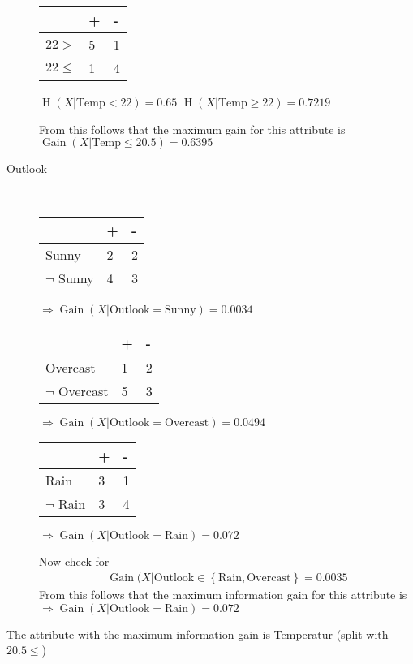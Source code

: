 \documentclass[10pt,a4paper,boxed]{hmcpset}
\DeclareMathOperator{\gain}{Gain}
\DeclareMathOperator{\entropy}{H}
\begin{document}
\begin{solution}
\begin{description}
			\begin{tabular}[H]{l|ll}
				& + & - \\ \hline
				$22 > $		& 5 & 1 \\
				$22 \leq$ & 1 & 4 \\
			\end{tabular}
			$\entropy(X|\mathrm{Temp}<22) = 0.65$
			$\entropy(X|\mathrm{Temp}\geq 22) = 0.7219$

			From this follows that the maximum gain for this attribute is 
			$\gain(X|\mathrm{Temp} \leq 20.5) = 0.6395$

		\item[Outlook]  \hfill \\
			\begin{tabular}[H]{l|ll}
				& + & - \\ \hline
				Sunny				 & 2 & 2 \\
				$\neg$ Sunny & 4 & 3 \\
			\end{tabular}
			$\Rightarrow \gain(X|\mathrm{Outlook}=\mathrm{Sunny}) = 0.0034$

			\begin{tabular}[H]{l|ll}
				& + & - \\ \hline
				Overcast				 & 1 & 2 \\
				$\neg$ Overcast & 5 & 3 \\
			\end{tabular}
			$\Rightarrow \gain(X|\mathrm{Outlook}=\mathrm{Overcast}) = 0.0494$

			\begin{tabular}[H]{l|ll}
				& + & - \\ \hline
				Rain				 & 3 & 1 \\
				$\neg$ Rain & 3 & 4 \\
			\end{tabular}
			$\Rightarrow \gain(X|\mathrm{Outlook}=\mathrm{Rain}) = 0.072$

			Now check for 
			\begin{align}
				\gain(X|\mathrm{Outlook}\in \left\{ \mathrm{Rain},\mathrm{Overcast} \right\} = 0.0035
			\end{align}
			From this follows that the maximum information gain for this attribute is 
			$\Rightarrow \gain(X|\mathrm{Outlook}=\mathrm{Rain}) = 0.072$
			\end{description}
			The attribute with the maximum information gain is Temperatur (split with $20.5\leq$)\\[2em]
			\begin{center}
\end{center}
\end{solution}
\end{document}
